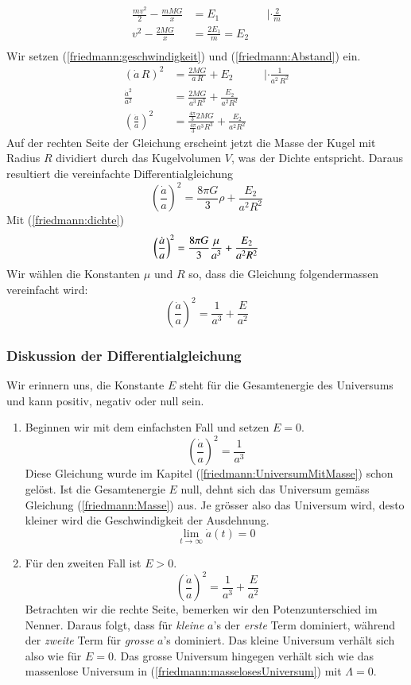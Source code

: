 \begin{refsection}
\begin{align*}
	\frac{m v^2}{2} - \frac{m M G}{x} &= E_1 &&| \cdot\frac{2}{m} \\ 
	v^2 - \frac{2 M G}{x} &= \frac{2E_1}{m} = E_2\\	
\end{align*}
Wir setzen (\ref{friedmann:geschwindigkeit}) und (\ref{friedmann:Abstand}) ein.
\begin{align*}
	\left( \dot{a} \, R\right)^2 &= \frac{2 M G}{a\,R} + E_2 &&| \cdot \frac{1}{a^2\,R^2}\\
	\frac{\dot{a}^2}{a^2} &= \frac{2 M G}{a^3 R^3} + \frac{E_2}{a^2 R^2} \\
	\left(\frac{\dot{a}}{a} \right)^2 &= \frac{\frac{4 \pi}{3}2 M G}{\frac{4 \pi}{3} a^3 R^3} + \frac{E_2}{a^2 R^2}
\end{align*}
Auf der rechten Seite der Gleichung erscheint jetzt die Masse der Kugel mit Radius $R$ dividiert durch das Kugelvolumen $V$, was der Dichte entspricht. Daraus resultiert die vereinfachte Differentialgleichung 
\begin{equation}
\left(\frac{\dot{a}}{a} \right)^2 = \frac{8 \pi G}{3} \rho + \frac{E_2}{a^2 R^2}
\label{friedmann:EnergieerhaltungUniversum}
\end{equation}
Mit (\ref{friedmann:dichte})
\[\left(\frac{\dot{a}}{a} \right)^2 = \frac{8 \pi G}{3} \frac{\mu}{a^3} + \frac{E_2}{a^2 R^2} \\\]
Wir wählen die Konstanten $\mu$ und $R$ so, dass die Gleichung folgendermassen vereinfacht wird:
\begin{equation}
\left(\frac{\dot{a}}{a} \right)^2 = \frac{1}{a^3} + \frac{E}{a^2}
\end{equation}

\subsubsection{Diskussion der Differentialgleichung}
Wir erinnern uns, die Konstante $E$ steht für die Gesamtenergie des Universums und kann positiv, negativ oder null sein.
\begin{enumerate}
	\item Beginnen wir mit dem einfachsten Fall und setzen $E = 0$.
	\[\left(\frac{\dot{a}}{a} \right)^2 = \frac{1}{a^3}\]
	Diese Gleichung wurde im Kapitel (\ref{friedmann:UniversumMitMasse}) schon gelöst. Ist die Gesamtenergie $E$ null, dehnt sich das Universum gemäss Gleichung (\ref{friedmann:Masse}) aus. Je grösser also das Universum wird, desto kleiner wird die Geschwindigkeit der Ausdehnung.
	\[\lim_{t\to\infty} \dot{a}(t) = 0\]
	\item Für den zweiten Fall ist $E > 0$.
	\[\ \left(\frac{\dot{a}}{a} \right)^2 = \frac{1}{a^3} + \frac{E}{a^2}\]
	Betrachten wir die rechte Seite, bemerken wir den Potenzunterschied im Nenner. Daraus folgt, dass für {\em kleine} $a$'s der {\em erste} Term dominiert, während der {\em zweite} Term für {\em grosse} $a$'s dominiert. Das kleine Universum verhält sich also wie für $E = 0$. Das grosse Universum hingegen verhält sich wie das massenlose Universum in (\ref{friedmann:masselosesUniversum}) mit $\Lambda = 0$.  
	

\end{enumerate}
\end{refsection}

